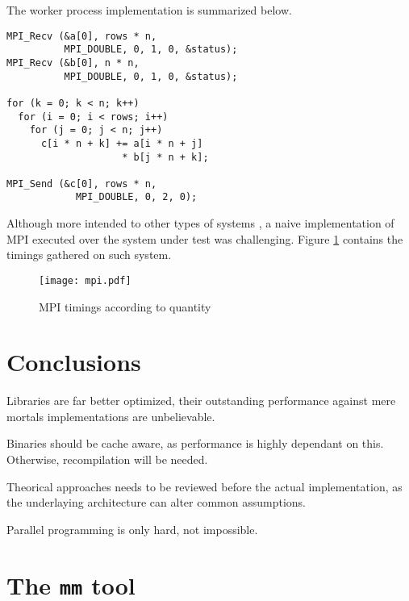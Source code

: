 \documentclass[a4paper,twocolumn]{article}
\begin{document}
\smallskip

The worker process implementation is summarized below.

\begin{verbatim}
MPI_Recv (&a[0], rows * n, 
          MPI_DOUBLE, 0, 1, 0, &status);
MPI_Recv (&b[0], n * n, 
          MPI_DOUBLE, 0, 1, 0, &status);

for (k = 0; k < n; k++)
  for (i = 0; i < rows; i++)
    for (j = 0; j < n; j++)
      c[i * n + k] += a[i * n + j] 
                    * b[j * n + k];

MPI_Send (&c[0], rows * n, 
            MPI_DOUBLE, 0, 2, 0);
\end{verbatim}

\smallskip

Although more intended to other types of systems \cite{beowulf}, a naive
implementation of MPI executed over the system under test was challenging.
Figure \ref{mpi-comparison} contains the timings gathered on such system.

\begin{center}
  \begin{figure}[H]
    \texttt{[image: mpi.pdf]}
    \caption{MPI timings according to quantity}
    \label{mpi-comparison}
  \end{figure}
\end{center}

\section{Conclusions}

Libraries are far better optimized, their outstanding performance against mere
mortals implementations are unbelievable.

\smallskip

Binaries should be cache aware, as performance is highly dependant on this.
Otherwise, recompilation will be needed.

\smallskip

Theorical approaches needs to be reviewed before the actual implementation, as
the underlaying architecture can alter common assumptions.

\smallskip

Parallel programming is only hard, not impossible.

\appendix
\section{The {\tt mm} tool}
\end{document}
